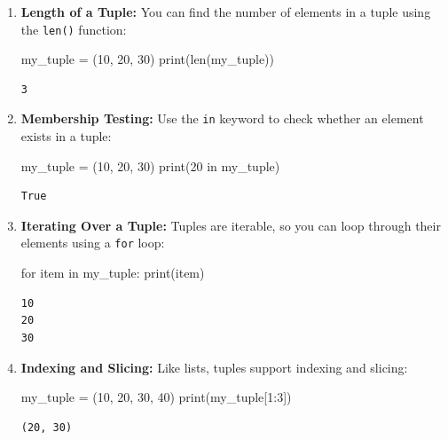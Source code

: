 \documentclass[
  letterpaper,
  DIV=11,
  numbers=noendperiod]{scrreprt}
\newenvironment{Shaded}{\begin{snugshade}}{\end{snugshade}}
\newcommand{\BuiltInTok}[1]{\textcolor[rgb]{0.00,0.23,0.31}{#1}}
\newcommand{\ControlFlowTok}[1]{\textcolor[rgb]{0.00,0.23,0.31}{#1}}
\newcommand{\DecValTok}[1]{\textcolor[rgb]{0.68,0.00,0.00}{#1}}
\newcommand{\KeywordTok}[1]{\textcolor[rgb]{0.00,0.23,0.31}{#1}}
\newcommand{\NormalTok}[1]{\textcolor[rgb]{0.00,0.23,0.31}{#1}}
\newcommand{\OperatorTok}[1]{\textcolor[rgb]{0.37,0.37,0.37}{#1}}
\begin{document}
\begin{enumerate}
\def\labelenumi{\arabic{enumi}.}
\item
  \textbf{Length of a Tuple:} You can find the number of elements in a
  tuple using the \texttt{len()} function:

\begin{Shaded}
\begin{Highlighting}[]
\NormalTok{my\_tuple }\OperatorTok{=}\NormalTok{ (}\DecValTok{10}\NormalTok{, }\DecValTok{20}\NormalTok{, }\DecValTok{30}\NormalTok{)}
\BuiltInTok{print}\NormalTok{(}\BuiltInTok{len}\NormalTok{(my\_tuple))  }
\end{Highlighting}
\end{Shaded}

\begin{verbatim}
3
\end{verbatim}
\item
  \textbf{Membership Testing:} Use the \texttt{in} keyword to check
  whether an element exists in a tuple:

\begin{Shaded}
\begin{Highlighting}[]
\NormalTok{my\_tuple }\OperatorTok{=}\NormalTok{ (}\DecValTok{10}\NormalTok{, }\DecValTok{20}\NormalTok{, }\DecValTok{30}\NormalTok{)}
\BuiltInTok{print}\NormalTok{(}\DecValTok{20} \KeywordTok{in}\NormalTok{ my\_tuple)  }
\end{Highlighting}
\end{Shaded}

\begin{verbatim}
True
\end{verbatim}
\item
  \textbf{Iterating Over a Tuple:} Tuples are iterable, so you can loop
  through their elements using a \texttt{for} loop:

\begin{Shaded}
\begin{Highlighting}[]
\ControlFlowTok{for}\NormalTok{ item }\KeywordTok{in}\NormalTok{ my\_tuple:}
    \BuiltInTok{print}\NormalTok{(item)}
\end{Highlighting}
\end{Shaded}

\begin{verbatim}
10
20
30
\end{verbatim}
\item
  \textbf{Indexing and Slicing:} Like lists, tuples support indexing and
  slicing:

\begin{Shaded}
\begin{Highlighting}[]
\NormalTok{my\_tuple }\OperatorTok{=}\NormalTok{ (}\DecValTok{10}\NormalTok{, }\DecValTok{20}\NormalTok{, }\DecValTok{30}\NormalTok{, }\DecValTok{40}\NormalTok{)}
\BuiltInTok{print}\NormalTok{(my\_tuple[}\DecValTok{1}\NormalTok{:}\DecValTok{3}\NormalTok{])  }
\end{Highlighting}
\end{Shaded}

\begin{verbatim}
(20, 30)
\end{verbatim}
\end{enumerate}
\end{document}
